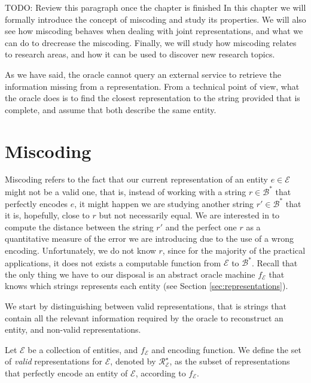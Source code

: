 {\color{red} TODO: Review this paragraph once the chapter is finished} In this chapter we will formally introduce the concept of miscoding and study its properties. We will also see how miscoding behaves when dealing with joint representations, and what we can do to drecrease the miscoding. Finally, we will study how miscoding relates to research areas, and how it can be used to discover new research topics.

{\color{red}As we have said, the oracle cannot query an external service to retrieve the information missing from a representation. From a technical point of view, what the oracle does is to find the closest representation to the string provided that is complete, and assume that both describe the same entity.}

%
%
\section{Miscoding}
\label{sec:miscoding}

Miscoding refers to the fact that our current representation of an entity $e \in \mathcal{E}$ might not be a valid one, that is, instead of working with a string $r \in \mathcal{B}^\ast$ that perfectly encodes $e$, it might happen we are studying another string $r' \in \mathcal{B}^\ast$ that it is, hopefully, close to $r$ but not necessarily equal. We are interested in to compute the distance between the string $r'$ and the perfect one $r$ as a quantitative measure of the error we are introducing due to the use of a wrong encoding. Unfortunately, we do not know $r$, since for the majority of the practical applications, it does not exists a computable function from $\mathcal{E}$ to $\mathcal{B}^\ast$. Recall that the only thing we have to our disposal is an abstract oracle machine $f_\mathcal{E}$ that knows which strings represents each entity (see Section \ref{sec:representations}).

We start by distinguishing between valid representations, that is strings that contain all the relevant information required by the oracle to reconstruct an entity, and non-valid representations.

\begin{definition}
Let $\mathcal{E}$ be a collection of entities, and $f_\mathcal{E}$ and encoding function. We define the set of \emph{valid} representations for $\mathcal{E}$, denoted by $\mathcal{R}^\star_\mathcal{E}$, as the subset of representations that perfectly encode an entity of $\mathcal{E}$, according to $f_\mathcal{E}$.
\end{definition}


